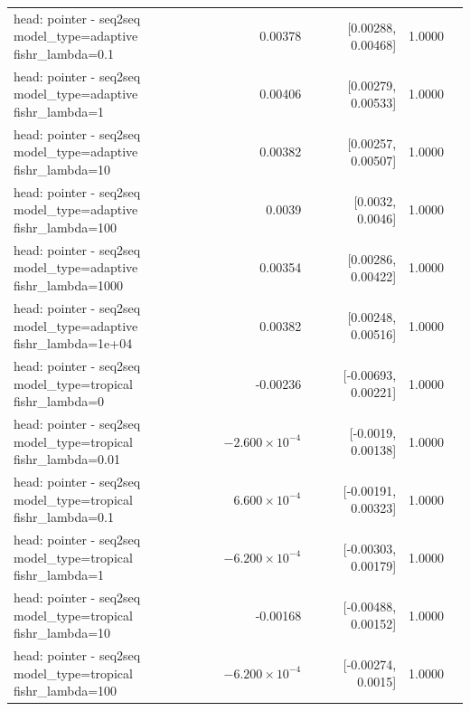 \documentclass[10pt]{article}
\makeatletter
\newcommand{\stackcell}[1]{\begin{tabular}[t]{@{}l@{}}#1\end{tabular}}
\makeatother
\begin{document}
{\begin{longtable}{lrrrl}
\stackcell{head: pointer - seq2seq\\\footnotesize model\_type=adaptive fishr\_lambda=0.1 } & 0.00378 & [0.00288, 0.00468] & 1.0000 & \\
\stackcell{head: pointer - seq2seq\\\footnotesize model\_type=adaptive fishr\_lambda=1 } & 0.00406 & [0.00279, 0.00533] & 1.0000 & \\
\stackcell{head: pointer - seq2seq\\\footnotesize model\_type=adaptive fishr\_lambda=10 } & 0.00382 & [0.00257, 0.00507] & 1.0000 & \\
\stackcell{head: pointer - seq2seq\\\footnotesize model\_type=adaptive fishr\_lambda=100 } & 0.0039 & [0.0032, 0.0046] & 1.0000 & \\
\stackcell{head: pointer - seq2seq\\\footnotesize model\_type=adaptive fishr\_lambda=1000 } & 0.00354 & [0.00286, 0.00422] & 1.0000 & \\
\stackcell{head: pointer - seq2seq\\\footnotesize model\_type=adaptive fishr\_lambda=1e+04 } & 0.00382 & [0.00248, 0.00516] & 1.0000 & \\
\stackcell{head: pointer - seq2seq\\\footnotesize model\_type=tropical fishr\_lambda=0 } & -0.00236 & [-0.00693, 0.00221] & 1.0000 & \\
\stackcell{head: pointer - seq2seq\\\footnotesize model\_type=tropical fishr\_lambda=0.01 } & $-2.600\times10^{-4}$ & [-0.0019, 0.00138] & 1.0000 & \\
\stackcell{head: pointer - seq2seq\\\footnotesize model\_type=tropical fishr\_lambda=0.1 } & $6.600\times10^{-4}$ & [-0.00191, 0.00323] & 1.0000 & \\
\stackcell{head: pointer - seq2seq\\\footnotesize model\_type=tropical fishr\_lambda=1 } & $-6.200\times10^{-4}$ & [-0.00303, 0.00179] & 1.0000 & \\
\stackcell{head: pointer - seq2seq\\\footnotesize model\_type=tropical fishr\_lambda=10 } & -0.00168 & [-0.00488, 0.00152] & 1.0000 & \\
\stackcell{head: pointer - seq2seq\\\footnotesize model\_type=tropical fishr\_lambda=100 } & $-6.200\times10^{-4}$ & [-0.00274, 0.0015] & 1.0000 & \\

\end{longtable}}
\end{document}
